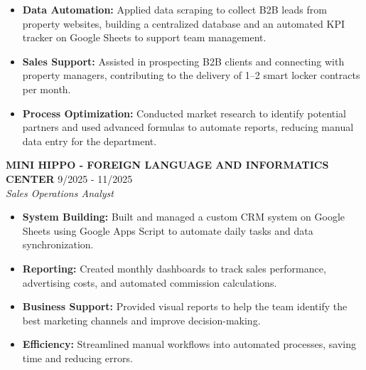 \documentclass[12pt,a4paper]{article}
\begin{document}
    \begin{itemize}[leftmargin=*, noitemsep]

        \item \textbf{Data Automation:} Applied data scraping to collect B2B leads from property websites, building a centralized database and an automated KPI tracker on Google Sheets to support team management.
        
        \item \textbf{Sales Support:} Assisted in prospecting B2B clients and connecting with property managers, contributing to the delivery of 1–2 smart locker contracts per month.
        
        \item \textbf{Process Optimization:} Conducted market research to identify potential partners and used advanced formulas to automate reports, reducing manual data entry for the department.
    \end{itemize}

\noindent \textbf{MINI HIPPO - FOREIGN LANGUAGE AND INFORMATICS CENTER} \hfill9/2025 - 11/2025 \\
\textit{Sales Operations Analyst} 
    
    \begin{itemize}[leftmargin=*, noitemsep]

        \item \textbf{System Building: }Built and managed a custom CRM system on Google Sheets using Google Apps Script to automate daily tasks and data synchronization.
        
        \item \textbf{Reporting: }Created monthly dashboards to track sales performance, advertising costs, and automated commission
calculations.
        \item \textbf{Business Support: }Provided visual reports to help the team identify the best marketing channels and improve
decision-making.
        \item \textbf{Efficiency: }Streamlined manual workflows into automated processes, saving time and reducing errors.
    
    \end{itemize}
\end{document}
